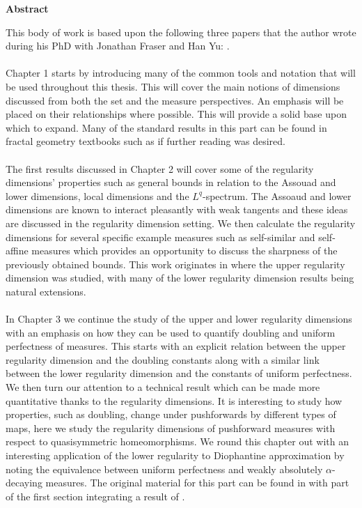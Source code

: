 \thispagestyle{plain}
\begin{center}
    \large
    \textbf{Abstract}
\end{center}


This body of work is based upon the following three papers that the author wrote during his PhD with Jonathan Fraser and Han Yu: \cite{fraser-howroyd2,howroyd-yu,howroyd}. 
\\ \\
Chapter 1 starts by introducing many of the common tools and notation that will be used throughout this thesis. This will cover the main notions of dimensions discussed from both the set and the measure perspectives. An emphasis will be placed on their relationships where possible. This will provide a solid base upon which to expand. Many of the standard results in this part can be found in fractal geometry textbooks such as \cite{falconer, mattila} if further reading was desired.
\\ \\
The first results discussed in Chapter 2 will cover some of the regularity dimensions' properties such as general bounds in relation to the Assouad and lower dimensions, local dimensions and the $L^q$-spectrum. The Assoaud and lower dimensions are known to interact pleasantly with weak tangents and these ideas are discussed in the regularity dimension setting. We then calculate the regularity dimensions for several specific example measures such as self-similar and self-affine measures which provides an opportunity to discuss the sharpness of the previously obtained bounds. This work originates in \cite{fraser-howroyd2} where the upper regularity dimension was studied, with many of the lower regularity dimension results being natural extensions.
\\ \\
In Chapter 3 we continue the study of the upper and lower regularity dimensions with an emphasis on how they can be used to quantify doubling and uniform perfectness of measures. This starts with an explicit relation between the upper regularity dimension and the doubling constants along with a similar link between the lower regularity dimension and the constants of uniform perfectness. We then turn our attention to a technical result which can be made more quantitative thanks to the regularity dimensions. It is interesting to study how properties, such as doubling, change under pushforwards by different types of maps, here we study the regularity dimensions of pushforward measures with respect to quasisymmetric homeomorphisms. We round this chapter out with an interesting application of the lower regularity to Diophantine approximation by noting the equivalence between uniform perfectness and weakly absolutely $\alpha$-decaying measures. The original material for this part can be found in \cite{howroyd} with part of the first section integrating a result of \cite{fraser-howroyd2}. 

